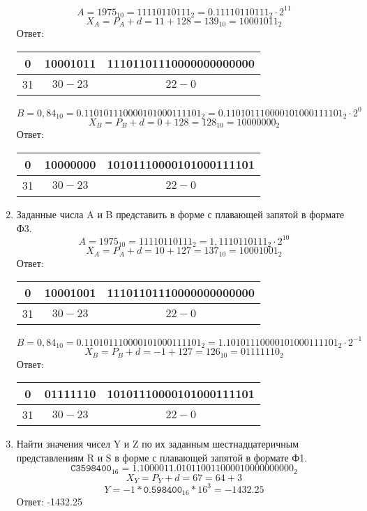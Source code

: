 \documentclass{article}
\begin{document}
\begin{enumerate}
            $$ 
                  A =
                  1975_{10} =
                  11110110111_2 = 
                  0.11110110111_2 \cdot 2^{11} $$
            $$ X_A = P_A + d = 11 + 128 = 139_{10} = 10001011_2 $$
            Ответ: \begin{tabular}{|c|c|c|}
                  \hline
                  0  & 10001011 & 11101101110000000000000 \\
                  \hline
                  31 & $30-23$  & $22-0$                  \\ 
                  \hline
            \end{tabular}
            $$ 
                  B =
                  0,84_{10} =
                  0.110101110000101000111101_{2} =
                  0.110101110000101000111101_{2} \cdot 2^0 $$
            $$ X_B = P_B + d = 0 + 128 = 128_{10} = 10000000_2 $$
            Ответ: \begin{tabular}{|c|c|c|}
                  \hline
                  0  & 10000000 & 10101110000101000111101 \\
                  \hline
                  31 & $30-23$  & $22-0$                  \\ 
                  \hline
            \end{tabular}
      \item Заданные числа A и B представить в форме с плавающей запятой в формате Ф3.
            $$ 
                  A =
                  1975_{10} =
                  11110110111_2 = 
                  1,1110110111_2 \cdot 2^{10} $$
            $$ X_A = P_A + d = 10 + 127 = 137_{10} = 10001001_2 $$
            Ответ: \begin{tabular}{|c|c|c|}
                  \hline
                  0  & 10001001 & 11101101110000000000000 \\
                  \hline
                  31 & $30-23$  & $22-0$                  \\ 
                  \hline
            \end{tabular}
            $$ 
                  B =
                  0,84_{10} =
                  0.110101110000101000111101_{2} =
                  1.10101110000101000111101_{2} \cdot 2^{-1} $$
            $$ X_B = P_B + d = -1 + 127 = 126_{10} = 01111110_2 $$
            Ответ: \begin{tabular}{|c|c|c|}
                  \hline
                  0  & 01111110 & 10101110000101000111101 \\
                  \hline
                  31 & $30-23$  & $22-0$                  \\ 
                  \hline
            \end{tabular}
      \item Найти значения чисел Y и Z по их заданным шестнадцатеричным представлениям R и S в форме с плавающей запятой в формате Ф1.
            $$ 
                  \texttt{C3598400}_{16} =
                  1.1000011.010110011000010000000000_2
            $$
            $$ X_Y = P_Y + d = 67 = 64 + 3 $$
            $$ Y = -1 * \texttt{0.598400}_{16} * 16^3 = -1432.25 $$
            Ответ: -1432.25
            

\end{enumerate}
\end{document}
